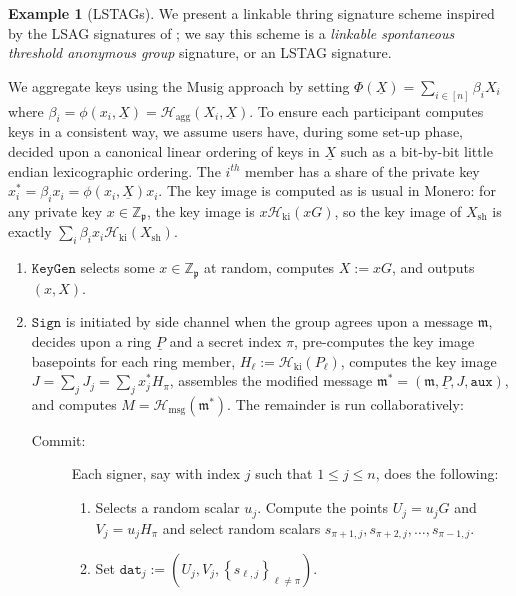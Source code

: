 \documentclass{mrl}
\theoremstyle{definition}
\numberwithin{theorem}{subsection}
\newtheorem{ex}[theorem]{Example}
\newcommand{\scalarField}{\mathbb{Z}_{\mathfrak{p}}}
\newcommand{\m}{\mathfrak{m}}
\begin{document}
\begin{ex}[LSTAGs]\label{implementation}
We present a linkable thring signature scheme inspired by the LSAG signatures of \cite{liu2004linkable}; we say this scheme is a \textit{linkable spontaneous threshold anonymous group} signature, or an LSTAG signature. 

We aggregate keys using the Musig approach by setting $\Phi(\underline{X}) = \sum_{i \in [n]} \beta_i X_i$ where $\beta_i = \phi(x_i, \underline{X}) = \mathcal{H}_{\text{agg}}(X_i, \underline{X})$. To ensure each participant computes keys in a consistent way, we assume users have, during some set-up phase, decided upon a canonical linear ordering of keys in $\underline{X}$ such as a bit-by-bit little endian lexicographic ordering. The $i^{th}$ member has a share of the private key $x^*_i = \beta_i x_i = \phi(x_i, \underline{X})x_i$. The key image is computed as is usual in Monero: for any private key $x \in \scalarField$, the key image is $x\mathcal{H}_{\text{ki}}(xG)$, so the key image of $X_{\text{sh}}$ is exactly $\sum_i \beta_i x_i \mathcal{H}_{\text{ki}}(X_{\text{sh}})$.

\begin{enumerate}
\item $\texttt{KeyGen}$ selects some $x \in \scalarField$ at random, computes $X := xG$, and outputs $(x,X)$.

\item $\texttt{Sign}$ is initiated by side channel when the group agrees upon a message $\m$, decides upon a ring $\underline{P}$ and a secret index $\pi$, pre-computes the key image basepoints for each ring member, $H_\ell := \mathcal{H}_{\text{ki}}(P_\ell)$, computes the key image $J = \sum_j J_j = \sum_j x^*_j H_\pi$, assembles the modified message $\m^* = (\m, \underline{P}, J, \texttt{aux})$, and computes $M = \mathcal{H}_{\text{msg}}(\m^*)$. The remainder is run collaboratively:

\begin{description}
\item [Commit:] Each signer, say with index $j$ such that $1 \leq j \leq n$, does the following: 
\begin{enumerate}
\item Selects a random scalar $u_j$. Compute the points $U_j = u_j G$ and $V_j = u_j H_\pi$ and select random scalars $s_{\pi+1, j}, s_{\pi+2, j}, \ldots, s_{\pi-1,j}$. 

\item Set $\texttt{dat}_{j} := (U_j, V_j, \left\{s_{\ell,j}\right\}_{\ell\neq \pi})$.


\end{enumerate}
\end{description}
\end{enumerate}
\end{ex}
\end{document}
